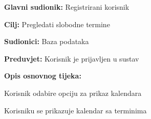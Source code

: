\noindent {}
\begin{packed_item}
	
	\item \textbf{Glavni sudionik: }Registrirani korisnik
	\item  \textbf{Cilj:} Pregledati slobodne termine
	\item  \textbf{Sudionici:} Baza podataka
	\item  \textbf{Preduvjet:} Korisnik je prijavljen u sustav
	\item  \textbf{Opis osnovnog tijeka:}
	
	\item[] \begin{packed_enum}
		
		\item Korisnik odabire opciju za prikaz kalendara
		\item Korisniku se prikazuje kalendar sa terminima

	\end{packed_enum}
	
\end{packed_item}

